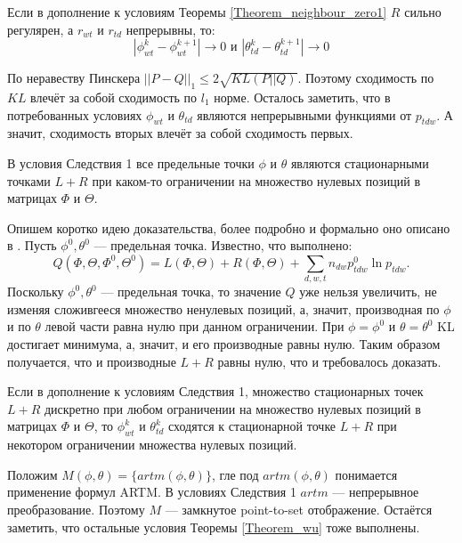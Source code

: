 \documentclass[12pt, twoside]{article}
\begin{document}
\begin{Corollary}
Если в дополнение к условиям Теоремы \ref{Theorem_neighbour_zero1} $R$ сильно регулярен, а $r_{wt}$ и $r_{td}$ непрерывны, то:
\[
|\phi_{wt}^{k} - \phi_{wt}^{k+1}| \to 0 \text{ и } |\theta_{td}^{k} - \theta_{td}^{k+1}| \to 0
\]
\end{Corollary}
\begin{Proof}
По неравеству Пинскера \cite{pinsker} $||P - Q||_1 \leq 2\sqrt{KL(P||Q)}$. Поэтому сходимость по $KL$ влечёт за собой сходимость по $l_1$ норме. Осталось заметить, что в потребованных условиях  $\phi_{wt}$ и $\theta_{td}$ являются непрерывными функциями от $p_{tdw}$. А значит, сходимость вторых влечёт за собой сходимость первых.
\end{Proof}
\begin{Corollary}
В условия Следствия 1 все предельные точки $\phi$ и $\theta$ являются стационарными точками $L +  R$ при каком-то ограничении на множество нулевых позиций в матрицах $\Phi$ и $\Theta$.
\end{Corollary}
\begin{Proof}
Опишем коротко идею доказательства,  более подробно и формально оно описано в \cite{wuem}. Пусть  $\phi^0, \theta^0$ --- предельная точка. Известно, что выполнено:
\[
Q(\Phi, \Theta, \Phi^0, \Theta^0) =  L(\Phi, \Theta) +  R(\Phi, \Theta) + \sum\limits_{d, w, t} n_{dw} p^0_{tdw} \ln{p_{tdw}}.
\]
Поскольку $\phi^0, \theta^0$  --- предельная точка, то значение $Q$ уже нельзя увеличить, не изменяя сложивгееся множество ненулевых позиций, а, значит, производная по $\phi$ и по $\theta$ левой части равна нулю при данном ограничении. При $\phi = \phi^0$ и $\theta = \theta^0$ KL достигает минимума, а, значит, и его производные равны нулю. Таким образом получается, что и производные $L +  R$ равны нулю, что и требовалось доказать.
\end{Proof}
\begin{Corollary}
Если в дополнение к условиям Следствия 1, множество стационарных точек $L +  R$ дискретно при любом  ограничении на множество нулевых позиций в матрицах $\Phi$ и $\Theta$, то $\phi_{wt}^{k}$ и $\theta_{td}^{k}$ сходятся к стационарной точке $L +  R$ при некотором ограничении множества нулевых позиций.
\end{Corollary}
\begin{Proof}
Положим $M(\phi, \theta) = \{artm(\phi, \theta)\}$, гле под $artm(\phi, \theta)$ понимается применение формул ARTM. В условиях Следствия 1 $artm$ --- непрерывное преобразование. Поэтому $M$ --- замкнутое point-to-set отображение. Остаётся заметить, что остальные условия Теоремы \ref{Theorem_wu} тоже выполнены.
\end{Proof}
\end{document}
